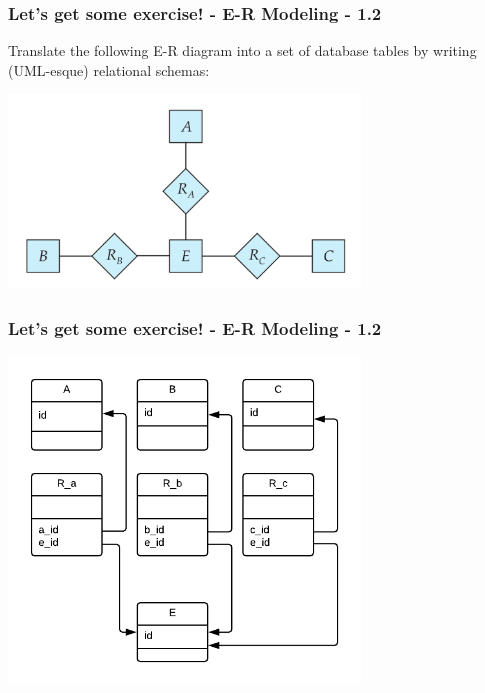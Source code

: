 \begin{frame}
\frametitle{Let's get some exercise! - E-R Modeling - 1.2}

Translate the following E-R diagram into a set of database tables by writing (UML-esque) relational schemas:

\begin{center}
  \includegraphics[width=0.7\textwidth]{images/three-binary-relationships.png}
\end{center}

\end{frame}


\begin{frame}
\frametitle{Let's get some exercise! - E-R Modeling - 1.2}

\begin{center}
  \includegraphics[width=0.7\textwidth]{images/1-2.png}
\end{center}


\end{frame}



